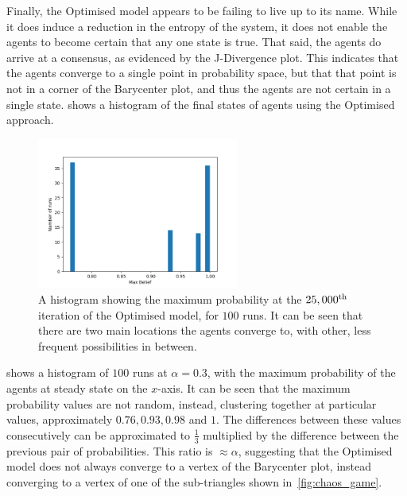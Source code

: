 Finally, the Optimised model appears to be failing to live up to its name. While it does induce a reduction in the entropy of the system, it does not enable the agents to become certain that any one state is true. That said, the agents do arrive at a consensus, as evidenced by the J-Divergence plot. This indicates that the agents converge to a single point in probability space, but that that point is not in a corner of the Barycenter plot, and thus the agents are not certain in a single state.  shows a histogram of the final states of agents using the Optimised approach. 

\begin{figure}[]
    \centering
    \includegraphics[width=0.59\textwidth]{Images/Figures/Optimised/ChaoticAttractorMaybe.png}
    \caption{ A histogram showing the maximum probability at the $25,000^\textnormal{th}$ iteration of the Optimised model, for $100$ runs. It can be seen that there are two main locations the agents converge to, with other, less frequent possibilities in between.  }
    \label{fig:optimised_problem_case}
\end{figure}

 shows a histogram of $100$ runs at $\alpha =0.3$, with the maximum probability of the agents at steady state on the $x$-axis. It can be seen that the maximum probability values are not random, instead, clustering together at particular values, approximately $0.76, 0.93, 0.98$ and $1$. The differences between these values consecutively can be approximated to $\frac{1}{3}$ multiplied by the difference between the previous pair of probabilities. This ratio is $\approx \alpha$, suggesting that the Optimised model does not always converge to a vertex of the Barycenter plot, instead converging to a vertex of one of the sub-triangles shown in~\cref{fig:chaos_game}. 

